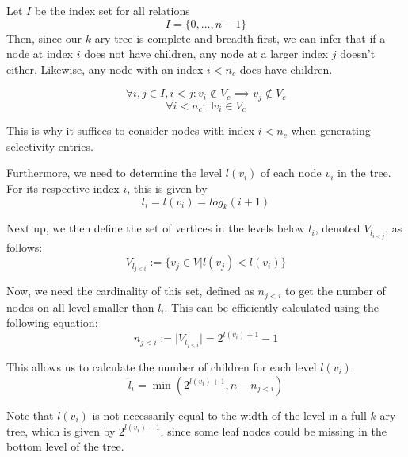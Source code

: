 \begin{note}
Let $I$ be the index set for all relations
\begin{equation}
    I = \{0,\ldots,n-1\}
\end{equation}
Then, since our $k$-ary tree is complete and breadth-first, we can infer that if a node at index $i$ does not have children, any node at a larger index $j$ doesn't either. Likewise, any node with an index $i < n_c$ does have children. 

\begin{equation}
    \forall i,j \in I, i < j \colon v_i \notin V_c \implies v_j \notin V_c
\end{equation}
\begin{equation}
    \forall i < n_c \colon \exists v_i \in V_c
\end{equation}

This is why it suffices to consider nodes with index $i < n_c$ when generating selectivity entries.
\end{note}

Furthermore, we need to determine the level $l(v_i)$ of each node $v_i$ in the tree. For its respective index $i$, this is given by
\begin{equation}
    l_i = l(v_i) = log_k(i+1)
\end{equation}

Next up, we then define the set of vertices in the levels below $l_i$, denoted $V_{l_{i<j}}$, as follows:
\begin{equation}
    V_{l_{j<i}} := \{v_j \in V \vert l(v_j) < l(v_i) \}
\end{equation}

Now, we need the cardinality of this set, defined as $n_{j<i}$ to get the number of nodes on all level smaller than $l_i$. This can be efficiently calculated using the following equation:
\begin{equation}
     n_{j<i} := \vert V_{l_{j<i}}\vert = 2^{l(v_i) + 1} - 1
\end{equation}

This allows us to calculate the number of children for each level $l(v_i)$.
\begin{equation}
    \hat{l}_i = \min(2^{l(v_i) + 1}, n - n_{j<i})
\end{equation}

\begin{note}
Note that $l(v_i)$ is not necessarily equal to the width of the level in a full $k$-ary tree, which is given by $2^{l(v_i) + 1}$, since some leaf nodes could be missing in the bottom level of the tree.
\end{note}


